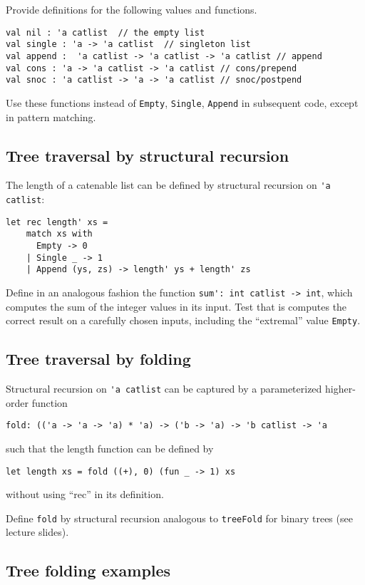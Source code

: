 \documentclass[a4paper,11pt]{article}
\begin{document}
Provide definitions for the following values and functions. 
\begin{verbatim}
val nil : 'a catlist  // the empty list
val single : 'a -> 'a catlist  // singleton list
val append :  'a catlist -> 'a catlist -> 'a catlist // append
val cons : 'a -> 'a catlist -> 'a catlist // cons/prepend
val snoc : 'a catlist -> 'a -> 'a catlist // snoc/postpend
\end{verbatim}
Use these functions instead of \verb|Empty|, \verb|Single|, \verb|Append| in subsequent code, except in pattern matching.

\subsection{Tree traversal by structural recursion}

The length of a catenable list can be defined by structural recursion on \verb|'a catlist|:
\begin{verbatim}
let rec length' xs =
    match xs with
      Empty -> 0
    | Single _ -> 1
    | Append (ys, zs) -> length' ys + length' zs
\end{verbatim}

Define in an analogous fashion the function \verb|sum': int catlist -> int|, which computes the sum of the integer values in its
input. Test that is computes the correct result on a carefully chosen inputs, including the ``extremal'' value \verb|Empty|.

\subsection{Tree traversal by folding}

Structural recursion on \verb|'a catlist| can be captured by a parameterized higher-order function
\begin{verbatim}
fold: (('a -> 'a -> 'a) * 'a) -> ('b -> 'a) -> 'b catlist -> 'a
\end{verbatim}
such that the length function can be defined by
\begin{verbatim}
let length xs = fold ((+), 0) (fun _ -> 1) xs
\end{verbatim}
without using ``rec'' in its definition.

Define \verb|fold| by structural recursion analogous to \verb|treeFold| for binary trees (see lecture slides).

\subsection{Tree folding examples}
\end{document}
